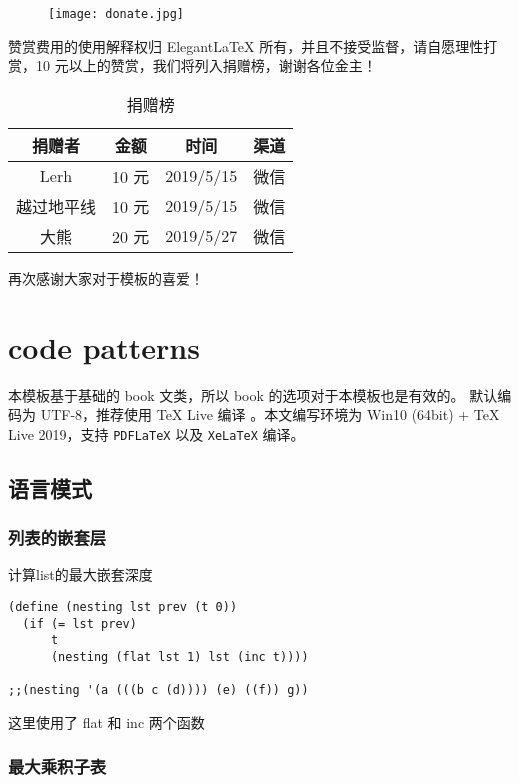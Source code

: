 \documentclass[cn,11pt]{elegantbook}
\begin{document}
\begin{figure}[htbp]
\centering
\texttt{[image: donate.jpg]}
\end{figure}

赞赏费用的使用解释权归 Elegant\LaTeX{} 所有，并且不接受监督，请自愿理性打赏，10 元以上的赞赏，我们将列入捐赠榜，谢谢各位金主！

\begin{table}[htbp]
  \centering
  \caption{捐赠榜}
    \begin{tabular}{cccc}
    \toprule
    捐赠者   & 金额 & 时间 & 渠道 \\
    \midrule
    Lerh  & 10 元  & 2019/5/15 & 微信 \\
    越过地平线 & 10 元    & 2019/5/15 & 微信 \\
	大熊 &  20 元 & 2019/5/27 & 微信 \\
    \bottomrule
    \end{tabular}%
\end{table}%

再次感谢大家对于模板的喜爱！

\chapter{code patterns}

本模板基于基础的 book 文类，所以 book 的选项对于本模板也是有效的。
默认编码为 UTF-8，推荐使用 \TeX{} Live 编译
。本文编写环境为 Win10 (64bit) + \TeX{} Live 2019，支持 \lstinline{PDFLaTeX} 以及 \lstinline{XeLaTeX} 编译。


\section{语言模式}
\subsection{列表的嵌套层}

计算list的最大嵌套深度
\begin{lstlisting}  
(define (nesting lst prev (t 0))
  (if (= lst prev)
      t
      (nesting (flat lst 1) lst (inc t))))

;;(nesting '(a (((b c (d)))) (e) ((f)) g))
\end{lstlisting}

这里使用了 flat 和 inc 两个函数

\subsection{最大乘积子表}
\end{document}
